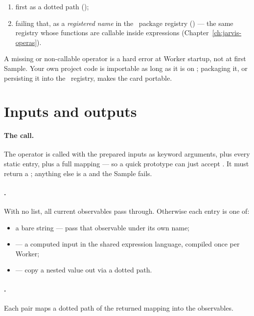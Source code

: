 \begin{enumerate}
  \item first as a dotted  path ();
  \item failing that, as a \emph{registered name} in the \Operas\ package registry
        () --- the same registry whose functions are callable
        inside expressions (Chapter~\ref{ch:jarvis-operas}).
\end{enumerate}

A missing or non-callable operator is a hard error at Worker startup, not at first
Sample. Your own project code is importable as long as it is on ;
packaging it, or persisting it into the \Operas\ registry, makes the card portable.

\section{Inputs and outputs}
\label{sec:opera-io}

\paragraph{The call.} The operator is called with the prepared inputs as keyword
arguments, plus every static  entry, plus a full 
mapping --- so a quick prototype can just accept
. It must return a ; anything
else is a  and the Sample fails.

\paragraph{.} With no  list, all current observables pass
through. Otherwise each entry is one of:

\begin{itemize}
  \item a bare string --- pass that observable under its own name;
  \item {} --- a computed input in the shared expression
        language, compiled once per Worker;
  \item {} --- copy a nested value out via a dotted path.
\end{itemize}

\paragraph{.} Each  pair maps a dotted path of the
returned mapping into the observables.

